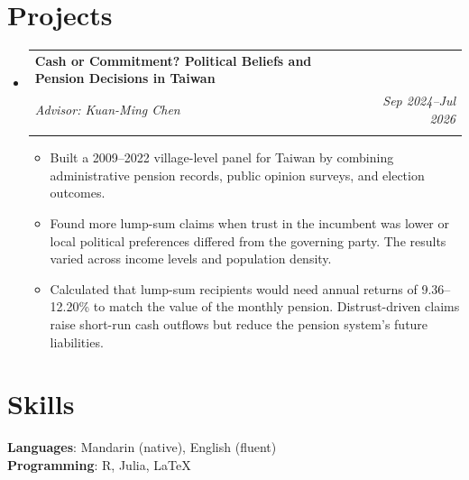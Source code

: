 \documentclass[letterpaper,11pt]{article}
\makeatletter
\newcommand{\resumeItem}[1]{
  \item\small{
    {#1}\vspace{-2pt}
  }
}
\newcommand{\resumeSubheading}[5]{
  \vspace{-2pt}\item
    \begin{tabular*}{0.97\textwidth}[t]{l@{\extracolsep{\fill}}r}
      \textbf{#1} & 
      {\small #2} \\
      \textit{\small #3} &  \textit{\small #4} \\
      \ifx#5\empty\else\textit{\small #5}\fi
    \end{tabular*}\vspace{-5pt}
}
\newcommand{\resumeSubSubheading}[2]{
    \item
    \begin{tabular*}{0.97\textwidth}{l@{\extracolsep{\fill}}r}
      \textit{\small#1} & \textit{\small #2}\\
    \end{tabular*}\vspace{-7pt}
}
\newcommand{\resumeSubHeadingListStart}{\begin{itemize}[leftmargin=0.15in, label={}]}
\newcommand{\resumeSubHeadingListEnd}{\end{itemize}}
\newcommand{\resumeItemListStart}{\begin{itemize}}
\newcommand{\resumeItemListEnd}{\end{itemize}\vspace{-5pt}}
\makeatother
\begin{document}
\section{\textbf{Projects}}
\resumeSubHeadingListStart
\resumeSubheading{Cash or Commitment? Political Beliefs and Pension Decisions in Taiwan}{}{Advisor: Kuan-Ming Chen}{Sep 2024--Jul 2026}{}
\resumeItemListStart
\resumeItem{Built a 2009--2022 village-level panel for Taiwan by combining administrative pension records, public opinion surveys, and election outcomes.}
\resumeItem{Found more lump-sum claims when trust in the incumbent was lower or local political preferences differed from the governing party. The results varied across income levels and population density.}
\resumeItem{Calculated that lump-sum recipients would need annual returns of 9.36--12.20\% to match the value of the monthly pension. Distrust-driven claims raise short-run cash outflows but reduce the pension system's future liabilities.}
\resumeItemListEnd




\resumeSubHeadingListEnd



\section{\textbf{Skills}}
 \begin{itemize}[leftmargin=0.15in, label={}]
    \small{\item{
    \vspace{1mm}
     \textbf{Languages}{: Mandarin (native), English (fluent)} \\
     \vspace{1mm}
     \textbf{Programming}{: R, Julia, \LaTeX}}}
 \end{itemize}
 
\end{document}
